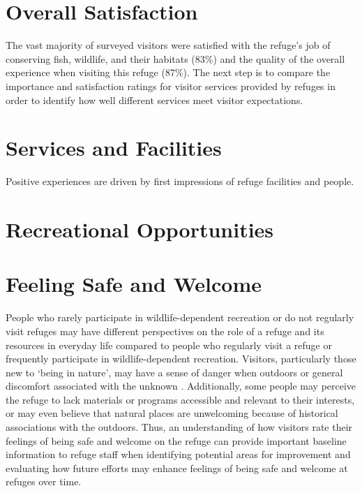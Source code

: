 \documentclass[]{book}
\let\BeginKnitrBlock\begin \let\EndKnitrBlock\end
\begin{document}
\section*{Overall Satisfaction}\label{overall-satisfaction}

The vast majority of surveyed visitors were satisfied with the refuge's
job of conserving fish, wildlife, and their habitats (83\%) and the
quality of the overall experience when visiting this refuge (87\%). The
next step is to compare the importance and satisfaction ratings for
visitor services provided by refuges in order to identify how well
different services meet visitor expectations.

\section*{Services and Facilities}\label{services-and-facilities}

Positive experiences are driven by first impressions of refuge
facilities and people.

\section*{Recreational Opportunities}\label{recreational-opportunities}

\section*{Feeling Safe and Welcome}\label{feeling-safe-and-welcome}

\BeginKnitrBlock{heading4}
People who rarely participate in wildlife-dependent recreation or do not
regularly visit refuges may have different perspectives on the role of a
refuge and its resources in everyday life compared to people who
regularly visit a refuge or frequently participate in wildlife-dependent
recreation. Visitors, particularly those new to `being in nature', may
have a sense of danger when outdoors or general discomfort associated
with the unknown \citep{USFWS2014}. Additionally, some people may
perceive the refuge to lack materials or programs accessible and
relevant to their interests, or may even believe that natural places are
unwelcoming because of historical associations with the outdoors. Thus,
an understanding of how visitors rate their feelings of being safe and
welcome on the refuge can provide important baseline information to
refuge staff when identifying potential areas for improvement and
evaluating how future efforts may enhance feelings of being safe and
welcome at refuges over time.
\EndKnitrBlock{heading4}
\end{document}
